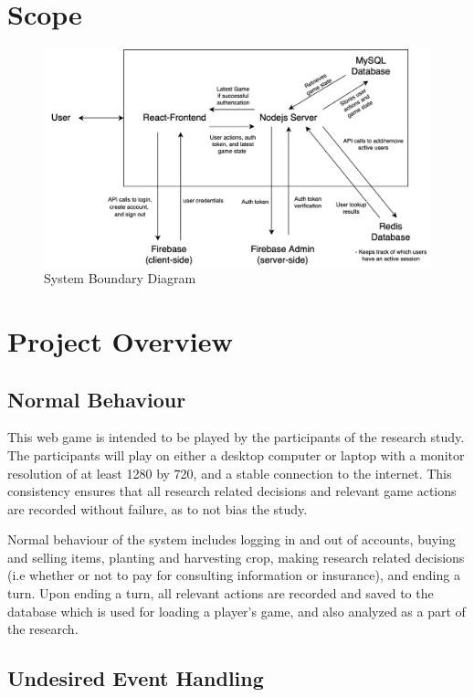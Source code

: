 \documentclass[12pt, titlepage]{article}
\begin{document}
\section{Scope}
\begin{figure}[H]
\centering
\includegraphics[width=1\textwidth]{SystemBoundary.png}
\caption{System Boundary Diagram}
\label{FigUH}
\end{figure}

\section{Project Overview}

\subsection{Normal Behaviour}

This web game is intended to be played by the participants of the research study. The participants will play on either a desktop computer or laptop with a monitor resolution of at least 1280 by 720, and a stable connection to the internet. This consistency ensures that all research related decisions and relevant game actions are recorded without failure, as to not bias the study.

Normal behaviour of the system includes logging in and out of accounts, buying and selling items, planting and harvesting crop, making research related decisions (i.e whether or not to pay for consulting information or insurance), and ending a turn. Upon ending a turn, all relevant actions are recorded and saved to the database which is used for loading a player's game, and also analyzed as a part of the research.

\subsection{Undesired Event Handling}
\end{document}
